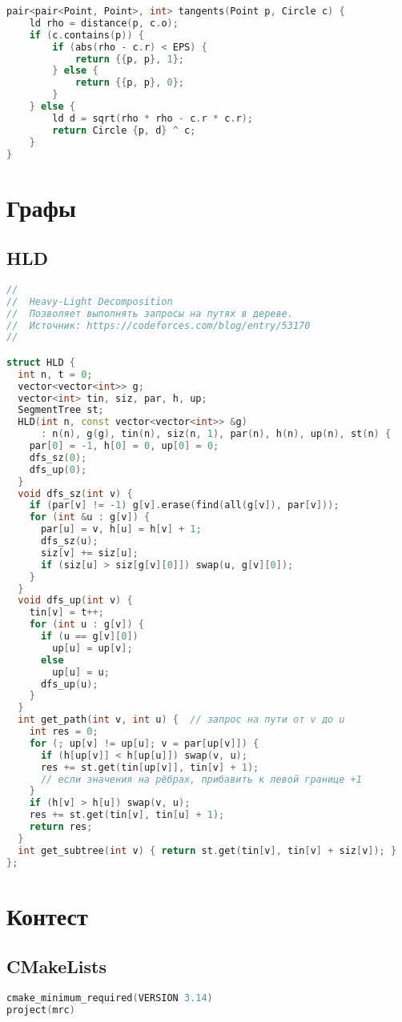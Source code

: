 \documentclass[10pt,a4paper,landscape,twosided]{extarticle}
\begin{document}
\begin{multicols}{3}
\begin{lstlisting}[language=C++]
pair<pair<Point, Point>, int> tangents(Point p, Circle c) {
    ld rho = distance(p, c.o);
    if (c.contains(p)) {
        if (abs(rho - c.r) < EPS) {
            return {{p, p}, 1};
        } else {
            return {{p, p}, 0};
        }
    } else {
        ld d = sqrt(rho * rho - c.r * c.r);
        return Circle {p, d} ^ c;
    }
}
\end{lstlisting}

\section{Графы}

\subsection{HLD}
\begin{lstlisting}[language=C++]
//
//  Heavy-Light Decomposition
//  Позволяет выполнять запросы на путях в дереве.
//  Источник: https://codeforces.com/blog/entry/53170
//

struct HLD {
  int n, t = 0;
  vector<vector<int>> g;
  vector<int> tin, siz, par, h, up;
  SegmentTree st;
  HLD(int n, const vector<vector<int>> &g)
      : n(n), g(g), tin(n), siz(n, 1), par(n), h(n), up(n), st(n) {
    par[0] = -1, h[0] = 0, up[0] = 0;
    dfs_sz(0);
    dfs_up(0);
  }
  void dfs_sz(int v) {
    if (par[v] != -1) g[v].erase(find(all(g[v]), par[v]));
    for (int &u : g[v]) {
      par[u] = v, h[u] = h[v] + 1;
      dfs_sz(u);
      siz[v] += siz[u];
      if (siz[u] > siz[g[v][0]]) swap(u, g[v][0]);
    }
  }
  void dfs_up(int v) {
    tin[v] = t++;
    for (int u : g[v]) {
      if (u == g[v][0])
        up[u] = up[v];
      else
        up[u] = u;
      dfs_up(u);
    }
  }
  int get_path(int v, int u) {  // запрос на пути от v до u
    int res = 0;
    for (; up[v] != up[u]; v = par[up[v]]) {
      if (h[up[v]] < h[up[u]]) swap(v, u);
      res += st.get(tin[up[v]], tin[v] + 1);
      // если значения на рёбрах, прибавить к левой границе +1
    }
    if (h[v] > h[u]) swap(v, u);
    res += st.get(tin[v], tin[u] + 1);
    return res;
  }
  int get_subtree(int v) { return st.get(tin[v], tin[v] + siz[v]); }
};
\end{lstlisting}

\section{Контест}

\subsection{CMakeLists}
\begin{lstlisting}[language=C++]
cmake_minimum_required(VERSION 3.14)
project(mrc)


\end{lstlisting}
\end{multicols}
\end{document}
